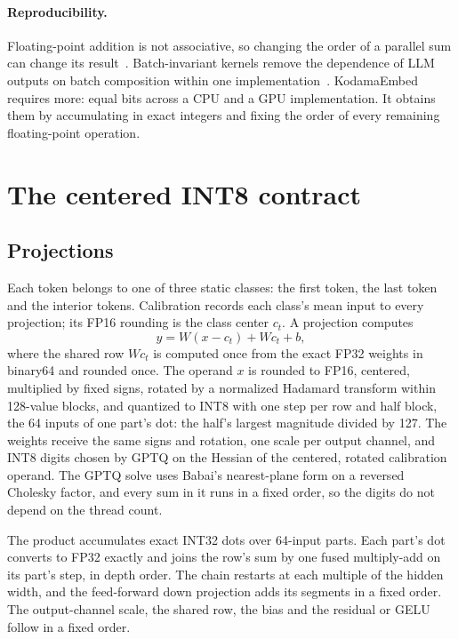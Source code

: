 \documentclass[10pt]{article}
\begin{document}
\paragraph{Reproducibility.}
Floating-point addition is not associative, so changing the order of a
parallel sum can change its result~\cite{demmel2015}.
Batch-invariant kernels remove the dependence of LLM outputs on batch
composition within one implementation~\cite{he2025}. KodamaEmbed requires more:
equal bits across a CPU and a GPU implementation. It obtains them by
accumulating in exact integers and fixing the order of every remaining
floating-point operation.

\section{The centered INT8 contract}
\label{sec:contract}

\subsection{Projections}

Each token belongs to one of three static classes: the first token, the last
token and the interior tokens. Calibration records each class's mean input to
every projection; its FP16 rounding is the class center $c_t$. A projection
computes
\begin{equation}
y = W(x - c_t) + W c_t + b,
\end{equation}
where the shared row $W c_t$ is computed once from the exact FP32 weights in
binary64 and rounded once. The operand $x$ is rounded to FP16, centered,
multiplied by fixed signs, rotated by a normalized Hadamard transform within
128-value blocks, and quantized to INT8 with one step per row and half block,
the 64 inputs of one part's dot: the half's largest magnitude divided by 127.
The weights receive the same signs
and rotation, one scale per output channel, and INT8 digits chosen by GPTQ on
the Hessian of the centered, rotated calibration operand. The GPTQ solve uses
Babai's nearest-plane form on a reversed Cholesky factor, and every sum in it
runs in a fixed order, so the digits do not depend on the thread count.

The product accumulates exact INT32 dots over 64-input parts. Each part's dot
converts to FP32 exactly and joins the row's sum by one fused multiply-add on
its part's step, in depth order. The chain restarts at each multiple of the
hidden width, and the feed-forward down projection adds its segments in a fixed
order.
The output-channel scale, the shared row, the bias and the residual or GELU
follow in a fixed order.
\end{document}
